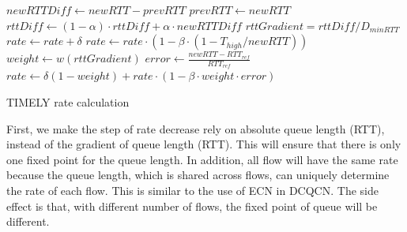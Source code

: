 \begin{algorithm}[t]
\footnotesize
{
\begin{algorithmic}[1]
\State $newRTTDiff \gets newRTT - prevRTT$
\State $prevRTT \gets newRTT$
\State $rttDiff \gets (1-\alpha) \cdot rttDiff + \alpha \cdot newRTTDiff$
\State $rttGradient = rttDiff/D_{minRTT}$
        \State $rate \gets rate + \delta$
        \State $rate \gets rate \cdot  (1 - \beta \cdot (1 - T_{high}/newRTT))$
\Else
		\State $weight \gets w(rttGradient)$	
		\State $error \gets \frac{{newRTT - RT{T_{ref}}}}{{RT{T_{ref}}}}$
        \State $rate \gets \delta (1-weight) +  rate \cdot (1 - \beta \cdot weight  \cdot error)$
\EndIf 
\end{algorithmic}
}
\caption{TIMELY rate calculation}
\label{fig:timely_fixed_algo}
\end{algorithm}


First, we make the step of rate decrease rely on absolute queue length (RTT), instead of the gradient of queue length (RTT). 
This will ensure that there is only one fixed point for the queue length. In addition, all flow will have the same rate 
because the queue length, which is shared across flows, can uniquely determine the rate of each flow. This is 
similar to the use of ECN in DCQCN. The side effect is that, with different number of flows, the fixed point of 
queue will be different.

